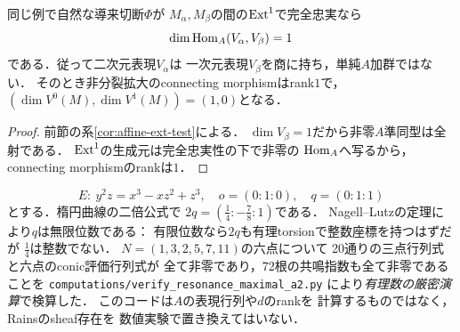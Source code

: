 \begin{corollary}[全$q$導来同値に対する明示的な検査条件]
\label{cor:a2-ff}
同じ例で自然な導来切断$\Phi$が
$M_\alpha,M_\beta$の間の$\operatorname{Ext}^1$で完全忠実なら
\[
 \dim\operatorname{Hom}_A(V_\alpha,V_\beta)=1
\]
である．従って二次元表現$V_\alpha$は
一次元表現$V_\beta$を商に持ち，単純$A$加群ではない．
そのとき非分裂拡大のconnecting morphismはrank$1$で，
$(\dim V^0(M),\dim V^1(M))=(1,0)$となる．
\end{corollary}
\begin{proof}
前節の系\ref{cor:affine-ext-test}による．
$\dim V_\beta=1$だから非零$A$準同型は全射である．
$\operatorname{Ext}^1$の生成元は完全忠実性の下で非零の
$\operatorname{Hom}_A$へ写るから，connecting morphismのrankは$1$．
\end{proof}

\begin{remark}[有理数上の検算例]
\label{rem:a2-rational-witness}
\[
 E:\ y^2z=x^3-xz^2+z^3,\quad o=(0:1:0),\quad
 q=(0:1:1)
\]
とする．楕円曲線の二倍公式で
$2q=(\frac14:-\frac78:1)$である．
Nagell--Lutzの定理により$q$は無限位数である：
有限位数なら$2q$も有理torsionで整数座標を持つはずだが
$\frac14$は整数でない．
$N=(1,3,2,5,7,11)$の六点について
20通りの三点行列式と六点のconic評価行列式が
全て非零であり，72根の共鳴指数も全て非零であることを
\texttt{computations/verify\_resonance\_maximal\_a2.py}
により\emph{有理数の厳密演算}で検算した．
このコードは$A$の表現行列や$d$のrankを
計算するものではなく，Rainsのsheaf存在を
数値実験で置き換えてはいない．
\end{remark}
